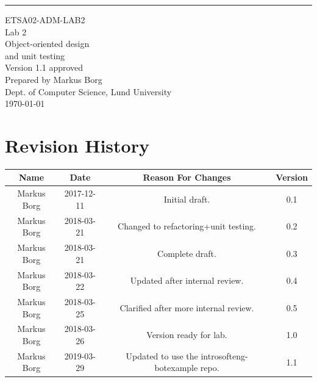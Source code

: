 \documentclass{scrreprt}
\date{}
\def\myversion{1.1 }
\begin{document}
\begin{flushright}
    \rule{16cm}{5pt}\vskip1cm
    \begin{bfseries}
    	\LARGE{ETSA02-ADM-LAB2}\\
    	\vspace{1.5cm}
        \Huge{Lab 2}\\
        \vspace{0.5cm}
        Object-oriented design\\
        \vspace{0.5cm}
        and unit testing\\
        \vspace{1.5cm}
        \LARGE{Version \myversion approved}\\
        \vspace{1.5cm}
        Prepared by Markus Borg\\
        Dept. of Computer Science, Lund University\\
        \vspace{1.5cm}
        \today\\
    \end{bfseries}
\end{flushright}


\chapter*{Revision History}

\begin{center}
    \begin{tabular}{|c|c|c|c|}
        \hline
	    Name & Date & Reason For Changes & Version\\
        \hline
	    Markus Borg & 2017-12-11 & Initial draft. & 0.1\\
        \hline
        Markus Borg & 2018-03-21 & Changed to refactoring+unit testing. & 0.2\\
        \hline
        Markus Borg & 2018-03-21 & Complete draft. & 0.3\\
        \hline
        Markus Borg & 2018-03-22 & Updated after internal review. & 0.4\\
        \hline
        Markus Borg & 2018-03-25 & Clarified after more internal review. & 0.5\\
        \hline
        Markus Borg & 2018-03-26 & Version ready for lab. & 1.0\\
        \hline
        Markus Borg & 2019-03-29 & Updated to use the introsofteng-botexample repo. & 1.1\\
        \hline
    \end{tabular}
\end{center}
\end{document}
